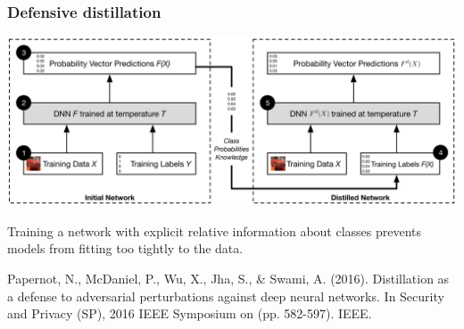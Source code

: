 \documentclass[9pt]{beamer}
\begin{document}
\begin{frame}
  \frametitle{Defensive distillation}

  \begin{center}
    \includegraphics[width = 0.9\linewidth]{images/distillation.png}
  \end{center}

  \medskip

  Training a network with explicit relative information about classes
  prevents models from fitting too tightly to the data.

  \medskip

  {\scriptsize Papernot, N., McDaniel, P., Wu, X., Jha, S., \& Swami,
    A. (2016). Distillation as a defense to adversarial perturbations
    against deep neural networks. In Security and Privacy (SP), 2016
    IEEE Symposium on (pp. 582-597). IEEE.}

\end{frame}
\end{document}
